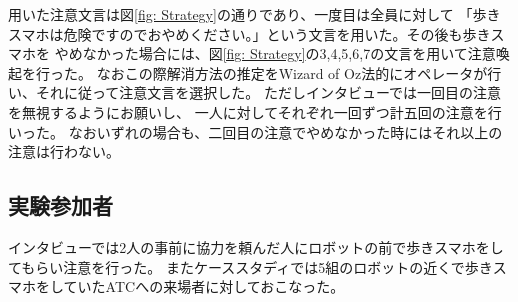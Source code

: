 \documentclass{kuisthesis}
\begin{document}
用いた注意文言は図\ref{fig: Strategy}の通りであり、一度目は全員に対して
「歩きスマホは危険ですのでおやめください。」という文言を用いた。その後も歩きスマホを
やめなかった場合には、図\ref{fig: Strategy}の3,4,5,6,7の文言を用いて注意喚起を行った。
なおこの際解消方法の推定をWizard of Oz法的にオペレータが行い、それに従って注意文言を選択した。
ただしインタビューでは一回目の注意を無視するようにお願いし、
一人に対してそれぞれ一回ずつ計五回の注意を行いった。
なおいずれの場合も、二回目の注意でやめなかった時にはそれ以上の注意は行わない。

\subsection{実験参加者}
インタビューでは2人の事前に協力を頼んだ人にロボットの前で歩きスマホをしてもらい注意を行った。
またケーススタディでは5組のロボットの近くで歩きスマホをしていたATCへの来場者に対しておこなった。
\end{document}
